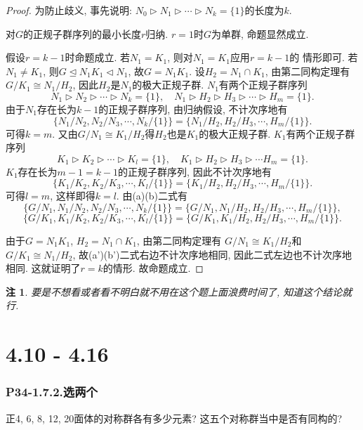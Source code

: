 \documentclass[12pt, a4paper, fontset=windows]{ctexart}
\newcommand{\isom}{\cong} %
\newtheorem*{remark}{注}
\begin{document}
\begin{proof}
为防止歧义, 事先说明: $N_0\rhd N_1\rhd\cdots\rhd N_k=\{1\}$的长度为$k$. 

对$G$的正规子群序列的最小长度$r$归纳. $r=1$时$G$为单群, 命题显然成立. 

假设$r=k-1$时命题成立. 若$N_1=K_1$, 则对$N_1=K_1$应用$r=k-1$的
情形即可. 若$N_1\ne K_1$, 则$G\unlhd N_1K_1\lhd N_1$, 
故$G=N_1K_1$. 设$H_2=N_1\cap K_1$, 
由第二同构定理有$G/K_1\isom N_1/H_2$, 因此$H_2$是$N_1$的极大正规子群. 
$N_1$有两个正规子群序列
\[N_1\rhd N_2\rhd\cdots\rhd N_k=\{1\},\quad N_1\rhd H_2\rhd H_3\rhd\cdots\rhd H_m=\{1\}. \]
由于$N_1$存在长为$k-1$的正规子群序列, 由归纳假设, 不计次序地有
\[\{N_1/N_2,N_2/N_3,\cdots,N_k/\{1\}\}=\{N_1/H_2,H_2/H_3,\cdots,H_m/\{1\}\}.\tag*{(a)}\]
可得$k=m$. 又由$G/N_1\isom K_1/H_2$得$H_2$也是$K_1$的极大正规子群. 
$K_1$有两个正规子群序列
\[K_1\rhd K_2\rhd\cdots\rhd K_l=\{1\},\quad K_1\rhd H_2\rhd H_3\rhd\cdots H_m=\{1\}. \]
$K_1$存在长为$m-1=k-1$的正规子群序列, 因此不计次序地有
\[\{K_1/K_2,K_2/K_3,\cdots,K_l/\{1\}\}=\{K_1/H_2,H_2/H_3,\cdots,H_m/\{1\}\}.\tag*{(b)}\]
可得$l=m$, 这样即得$k=l$. 由(a)(b)二式有
\[\{G/N_1,N_1/N_2,N_2/N_3,\cdots,N_k/\{1\}\}=\{G/N_1,N_1/H_2,H_2/H_3,\cdots,H_m/\{1\}\},\tag*{(a')}\]
\[\{G/K_1,K_1/K_2,K_2/K_3,\cdots,K_l/\{1\}\}=\{G/K_1,K_1/H_2,H_2/H_3,\cdots,H_m/\{1\}\}.\tag*{(b')}\]

由于$G=N_1K_1$, $H_2=N_1\cap K_1$, 由第二同构定理有
$G/N_1\isom K_1/H_2$和$G/K_1\isom N_1/H_2$, 
故(a')(b')二式右边不计次序地相同, 因此二式左边也不计次序地相同. 
这就证明了$r=k$的情形. 故命题成立. 
\end{proof}

\begin{remark}
要是不想看或者看不明白就不用在这个题上面浪费时间了, 知道这个结论就行. 
\end{remark}

\clearpage
\part{4.10 - 4.16}

\section*{P34-1.7.2.\normalsize 选两个}

正4, 6, 8, 12, 20面体的对称群各有多少元素? 
这五个对称群当中是否有同构的? 
\end{document}
